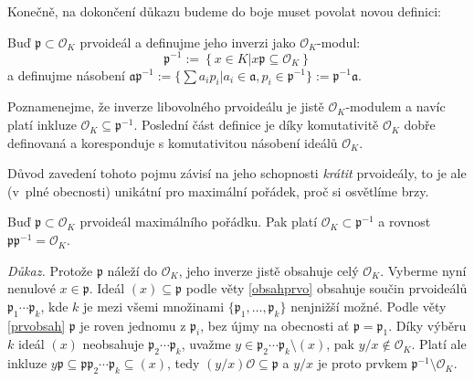 \documentclass[12pt]{report}
\begin{document}
Konečně, na dokončení důkazu budeme do boje muset povolat novou definici:
\begin{definice}
Buď $\mathfrak{p} \subset \mathcal{O}_K$ prvoideál a definujme jeho inverzi jako $\mathcal{O}_K$-modul:
\begin{equation*}
\mathfrak{p}^{-1} := \left\lbrace x \in K \left\vert \right. x \mathfrak{p} \subseteq \mathcal{O}_K \right\rbrace
\end{equation*}
a definujme násobení $\mathfrak{a} \mathfrak{p}^{-1} := \lbrace \sum a_i p_i \vert a_i \in \mathfrak{a}, p_i \in \mathfrak{p}^{-1} \rbrace := \mathfrak{p}^{-1} \mathfrak{a}$.
\end{definice}

Poznamenejme, že inverze libovolného prvoideálu je jistě $\mathcal{O}_K$-modulem a navíc platí inkluze $\mathcal{O}_K \subseteq \mathfrak{p}^{-1}$. Poslední část definice je díky komutativitě $\mathcal{O}_K$ dobře definovaná a koresponduje s komutativitou násobení ideálů $\mathcal{O}_K$.

Důvod zavedení tohoto pojmu závisí na jeho schopnosti \textit{krátit} prvoideály, to je ale (v~plné obecnosti) unikátní pro maximální pořádek, proč si osvětlíme brzy.

\begin{veta}
Buď $\mathfrak{p} \subset \mathcal{O}_K$ prvoideál maximálního pořádku. Pak platí $\mathcal{O}_K \subset \mathfrak{p}^{-1}$ a rovnost $\mathfrak{p} \mathfrak{p}^{-1} = \mathcal{O}_K$.
\end{veta}
\noindent \textit{Důkaz.} Protože $\mathfrak{p}$ náleží do $\mathcal{O}_K$, jeho inverze jistě obsahuje celý $\mathcal{O}_K$. Vyberme nyní nenulové $x \in \mathfrak{p}$. Ideál $(x) \subseteq \mathfrak{p}$ podle věty \ref{obsahprvo} obsahuje součin prvoideálů $\mathfrak{p}_1 \cdots \mathfrak{p}_k$, kde $k$ je mezi všemi množinami $\lbrace \mathfrak{p}_1,\dots,\mathfrak{p}_k \rbrace$ nenjnižší možné. Podle věty \ref{prvobsah} $\mathfrak{p}$ je roven jednomu z $\mathfrak{p}_i$, bez újmy na obecnosti ať $\mathfrak{p} = \mathfrak{p}_1$. Díky výběru $k$ ideál $(x)$ neobsahuje $\mathfrak{p}_2 \cdots \mathfrak{p}_k$, uvažme $y \in \mathfrak{p}_2 \cdots \mathfrak{p}_k \setminus (x)$, pak $y/x \not\in \mathcal{O}_K$. Platí ale inkluze $y \mathfrak{p} \subseteq \mathfrak{p} \mathfrak{p}_2 \cdots \mathfrak{p}_k \subseteq (x)$, tedy $(y/x) \mathcal{O} \subseteq \mathfrak{p}$ a $y/x$ je proto prvkem $\mathfrak{p}^{-1} \setminus \mathcal{O}_K$.
\end{document}
